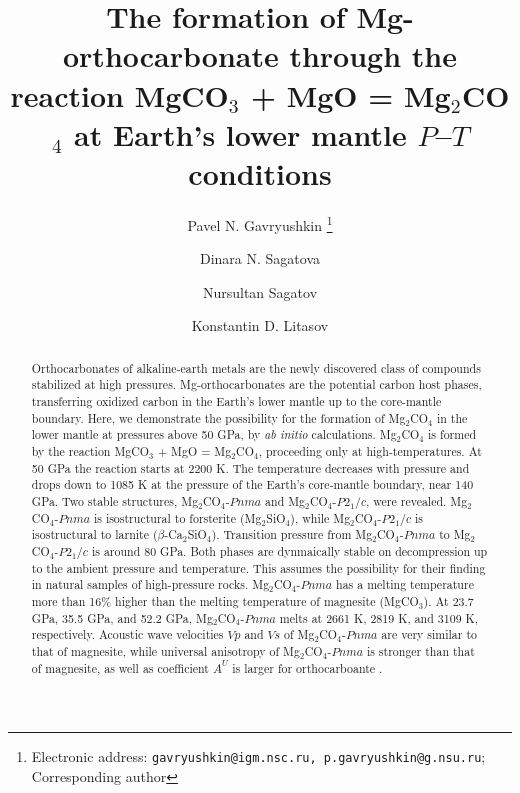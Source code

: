 \documentclass[a4paperm]{article}
\begin{document}

\title{The formation of Mg-orthocarbonate through the reaction MgCO$_3$ + MgO = Mg$_2$CO$_4$ at Earth's lower mantle $P$--$T$ conditions}


\author[1,2]{Pavel N. Gavryushkin
   \thanks{Electronic address: \texttt{gavryushkin@igm.nsc.ru, p.gavryushkin@g.nsu.ru}; Corresponding author}}     
\author[1,2]{Dinara N. Sagatova}
\author[1]{Nursultan Sagatov}
\author[3]{Konstantin D. Litasov}


\date{}
\maketitle


\begin{abstract}
Orthocarbonates of alkaline-earth metals are the newly discovered class of compounds stabilized at high pressures.
Mg-orthocarbonates are the potential carbon host phases, transferring oxidized carbon in the Earth's lower mantle up to the core-mantle boundary.
Here, we demonstrate the possibility for the formation of Mg$_2$CO$_4$ in the lower mantle at pressures above 50 GPa, by {\it ab initio} calculations.
Mg$_2$CO$_4$ is formed by the reaction MgCO$_3$ + MgO = Mg$_2$CO$_4$, proceeding only at high-temperatures.
At 50 GPa the reaction starts at 2200 K.
The temperature decreases with pressure and drops down to 1085 K at the pressure of the Earth's core-mantle boundary, near 140 GPa.
Two stable structures, Mg$_2$CO$_4$-$Pnma$ and Mg$_2$CO$_4$-$P2_1/c$, were revealed.
Mg$_2$CO$_4$-$Pnma$ is isostructural to forsterite (Mg$_2$SiO$_4$), while Mg$_2$CO$_4$-$P2_1/c$ is isostructural to larnite ($\beta$-Ca$_2$SiO$_4$).
Transition pressure from Mg$_2$CO$_4$-$Pnma$ to Mg$_2$CO$_4$-$P2_1/c$ is around 80 GPa.
Both phases are dynmaically stable on decompression up to the ambient pressure and temperature. 
This assumes the possibility for their finding in natural samples of high-pressure rocks.
Mg$_2$CO$_4$-$Pnma$ has a melting temperature more than 16\% higher  than the melting temperature of magnesite (MgCO$_3$).
At 23.7 GPa, 35.5 GPa, and 52.2 GPa, Mg$_2$CO$_4$-$Pnma$  melts at 2661 K, 2819 K, and 3109 K, respectively.
Acoustic wave velocities $Vp$ and $Vs$ of Mg$_2$CO$_4$-$Pnma$ are very similar to that of magnesite, while universal anisotropy of Mg$_2$CO$_4$-$Pnma$ is stronger than that of magnesite, as well as coefficient $A^U$ is larger for orthocarboante .



\end{abstract}
\end{document}

